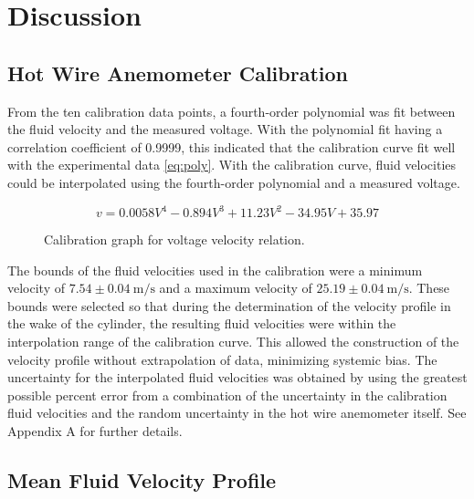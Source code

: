 \documentclass[journal,letterpaper]{IEEEtran}
\begin{document}
\section{Discussion}

\subsection{Hot Wire Anemometer Calibration}

From the ten calibration data points, a fourth-order polynomial was fit between the fluid velocity and the measured voltage.
With the polynomial fit having a correlation coefficient of 0.9999, this indicated that the calibration curve fit well with the experimental data \eqref{eq:poly}.
With the calibration curve, fluid velocities could be interpolated using the fourth-order polynomial and a measured voltage. 

\begin{equation} \label{eq:poly}
    v = 0.0058V^4 - 0.894V^3 + 11.23V^2 - 34.95V + 35.97
\end{equation}

\begin{figure}[H]
    \centering
    \caption{Calibration graph for voltage velocity relation.}
    \label{fig:calCurve}
\end{figure}

The bounds of the fluid velocities used in the calibration were a minimum velocity of $7.54 \pm \qty{0.04}{\m\per\s}$ and a maximum velocity of $25.19 \pm \qty{0.04}{\m\per\s}$.
These bounds were selected so that during the determination of the velocity profile in the wake of the cylinder, the resulting fluid velocities were within the interpolation range of the calibration curve.
This allowed the construction of the velocity profile without extrapolation of data, minimizing systemic bias.
The uncertainty for the interpolated fluid velocities was obtained by using the greatest possible percent error from a combination of the uncertainty in the calibration fluid velocities and the random uncertainty in the hot wire anemometer itself.
See Appendix A for further details.

\subsection{Mean Fluid Velocity Profile}
\end{document}
